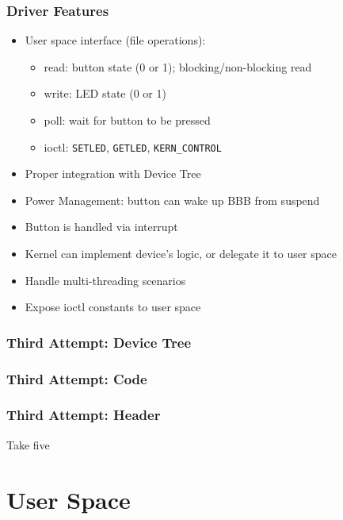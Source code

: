 \begin{frame}
  \frametitle{Driver Features}
  \begin{itemize}
    \item User space interface (file operations):
      \begin{itemize}
        \item read: button state (0 or 1); blocking/non-blocking read
        \item write: LED state (0 or 1)
        \item poll: wait for button to be pressed
        \item ioctl: \texttt{SETLED}, \texttt{GETLED}, \texttt{KERN\_CONTROL}
      \end{itemize}
    \item Proper integration with Device Tree
    \item Power Management: button can wake up BBB from suspend
    \item Button is handled via interrupt
    \item Kernel can implement device's logic, or delegate it to user space
    \item Handle multi-threading scenarios
    \item Expose ioctl constants to user space
  \end{itemize}
\end{frame}

\begin{frame}[containsverbatim]
  \frametitle{Third Attempt: Device Tree}
  
  \vspace*{-5mm}
\end{frame}

\begin{frame}[containsverbatim,allowframebreaks=1]
  \frametitle{Third Attempt: Code}
  
\end{frame}

\begin{frame}[containsverbatim]
  \frametitle{Third Attempt: Header}
  
\end{frame}

\begin{frame}[standout]
  Take five
\end{frame}

\section{User Space}

